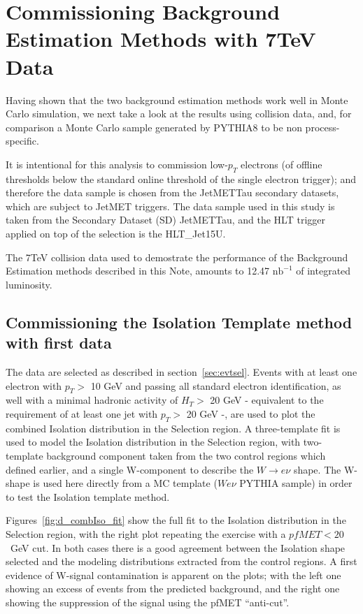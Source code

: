 \section{Commissioning Background Estimation Methods with 7TeV Data}

Having shown that the two background estimation methods work well in Monte Carlo simulation, we next take a look at the results using collision data, and, for comparison a Monte Carlo sample generated by PYTHIA8 to be non process-specific. 

It is intentional for this analysis to commission low-$p_{T}$ electrons (of offline thresholds below the standard online threshold of the single electron trigger); and therefore the data sample is chosen from the JetMETTau secondary datasets, which are subject to JetMET triggers. The data sample used in this study is taken from the Secondary Dataset (SD) JetMETTau, and the HLT trigger applied on top of the selection is the HLT\_Jet15U.

The 7TeV collision data used to demostrate the performance of the Background Estimation methods described in this Note, amounts to 12.47 $\text{nb}^{-1}$ of integrated luminosity.

\subsection{Commissioning the Isolation Template method with first data}

The data are selected as described in section~\ref{sec:evtsel}. Events with at least one electron with $p_{T}>$ 10 GeV and passing all standard electron identification, as well with a minimal hadronic activity of $H_{T} >$ 20 GeV - equivalent to the requirement of at least one jet with $p_{T}>$ 20 GeV -, are used to plot the combined Isolation distribution in the Selection region. A three-template fit is used to model the Isolation distribution in the Selection region, with two-template background component taken from the two control regions which defined earlier, and a single W-component to describe the $W \rightarrow e\nu$ shape. The W-shape is used here directly from a MC template ($We\nu$ PYTHIA sample) in order to test the Isolation template method.  

Figures~\ref{fig:d_combIso_fit} show the full fit to the Isolation distribution in the Selection region, with the right plot repeating the exercise with a $pfMET < 20$~GeV cut. In both cases there is a good agreement between the Isolation shape selected and the modeling distributions extracted from the control regions. A first evidence of W-signal contamination is apparent on the plots; with the left one showing an excess of events from the predicted background, and the right one showing the suppression of the signal using the pfMET ``anti-cut''. 

